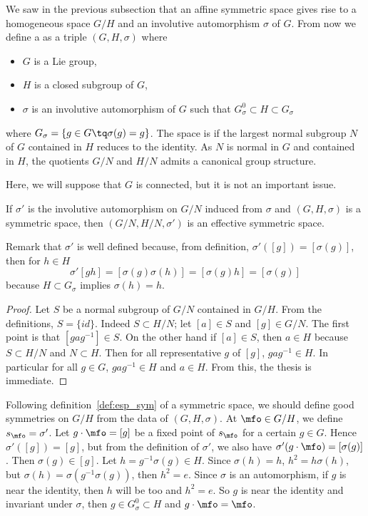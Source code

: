 We saw in the previous subsection that an affine symmetric space gives rise to a homogeneous space $G/H$ and an involutive automorphism $\sigma$ of $G$. From now we define a  as a triple $(G,H,\sigma)$ where

\begin{itemize}
\item $G$ is a Lie group,
\item $H$ is a closed subgroup of $G$,
\item $\sigma$ is an involutive automorphism of $G$ such that $G_{\sigma}^0\subset H\subset G_{\sigma}$
\end{itemize}
where $G_{\sigma}=\{g\in G\tq \sigma(g)=g\}$. The space is  if the largest normal subgroup $N$ of $G$ contained in $H$ reduces to the identity. As $N$ is normal in $G$ and contained in $H$, the quotients $G/N$ and $H/N$ admits a canonical group structure.

Here, we will suppose that $G$ is connected, but it is not an important issue.

\begin{proposition}
If $\sigma'$ is the involutive automorphism on $G/N$ induced from $\sigma$ and $(G,H,\sigma)$ is a symmetric space, then $(G/N,H/N,\sigma')$ is an effective symmetric space.
\end{proposition}

Remark that $\sigma'$ is well defined because, from definition, $\sigma'([g])=[\sigma(g)]$, then for $h\in H$
\begin{equation}
\sigma'[gh]=[\sigma(g)\sigma(h)]
           =[\sigma(g)h]
           =[\sigma(g)]
\end{equation}
because $H\subset G_{\sigma}$ implies $\sigma(h)=h$.

\begin{proof}
Let $S$ be a normal subgroup of $G/N$ contained in $G/H$. From the definitions, $S=\{id\}$. Indeed $S\subset H/N$; let $[a]\in S$ and $[g]\in G/N$. The first point is that $[gag^{-1}]\in S$. On the other hand if $[a]\in S$, then $a\in H$ because $S\subset H/N$ and $N\subset H$. Then for all representative $g$ of $[g]$, $gag^{-1}\in H$. In particular for all $g\in G$, $gag^{-1}\in H$ and $a\in H$. From this, the thesis is immediate.
\end{proof}

Following definition~\ref{def:esp_sym} of a symmetric space, we should define good symmetries on $G/H$ from the data of $(G,H,\sigma)$. At $\mfo\in G/H$, we define $s_{\mfo}=\sigma'$. Let $g\cdot\mfo=[g]$ be a fixed point of $s_{\mfo}$ for a certain $g\in G$. Hence $\sigma'([g])=[g]$, but from the definition of $\sigma'$, we also have $\sigma'(g\cdot \mfo)=[\sigma(g)]$. Then $\sigma(g)\in[g]$. Let $h=g^{-1}\sigma(g)\in H$. Since $\sigma(h)=h$, $h^2=h\sigma(h)$, but $\sigma(h)=\sigma(g^{-1}\sigma(g))$, then $h^2=e$.
Since $\sigma$ is an automorphism, if $g$ is near the identity, then $h$ will be too and $h^2=e$. So $g$ is near the identity and invariant under $\sigma$, then $g\in G_{\sigma}^0\subset H$ and $g\cdot\mfo=\mfo$.

